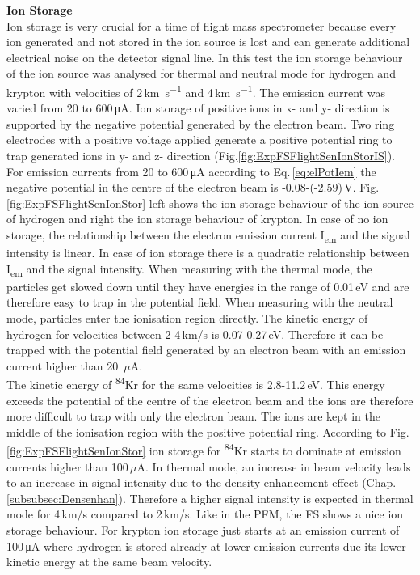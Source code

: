 		\textbf{Ion Storage}\\ %
		Ion storage is very crucial for a time of flight mass spectrometer because every ion generated and not stored in the ion source is lost and can generate additional electrical noise on the detector signal line. In this test the ion storage behaviour of the ion source was analysed for thermal and neutral mode for hydrogen and krypton with velocities of 2\,\si{\kilo\meter\per\second} and 4\,\si{\kilo\meter\per\second}. The emission current was varied from 20 to 600\,\si{\micro\ampere}. Ion storage of positive ions in x- and y- direction is supported by the negative potential generated by the electron beam. Two ring electrodes with a positive voltage applied generate a positive potential ring to trap generated ions in y- and z- direction (Fig.\ref{fig:ExpFSFlightSenIonStorIS}). For emission currents from 20 to 600\,\si{\micro\ampere} according to Eq.\,\eqref{eq:elPotIem} the negative potential in the centre of the electron beam is -0.08-(-2.59)\,\si{\volt}. Fig.\ref{fig:ExpFSFlightSenIonStor} left shows the ion storage behaviour of the ion source of hydrogen and right the ion storage behaviour of krypton. In case of no ion storage, the relationship between the electron emission current I\textsubscript{em} and the signal intensity is linear. In case of ion storage there is a quadratic relationship between I\textsubscript{em} and the signal intensity. When measuring with the thermal mode, the particles get slowed down until they have energies in the range of 0.01\,\si{\electronvolt} and are therefore easy to trap in the potential field. When measuring with the neutral mode, particles enter the ionisation region directly. The kinetic energy of hydrogen for velocities between 2-4\,km/s is 0.07-0.27\,eV. Therefore it can be trapped with the potential field generated by an electron beam with an emission current higher than 20~$\mu$A.\\
		The kinetic energy of \textsuperscript{84}Kr for the same velocities is 2.8-11.2\,eV. This energy exceeds the potential of the centre of the electron beam and the ions are therefore more difficult to trap with only the electron beam. The ions are kept in the middle of the ionisation region with the positive potential ring. According to Fig.\,\ref{fig:ExpFSFlightSenIonStor} ion storage for \textsuperscript{84}Kr starts to dominate at emission currents higher than 100\,$\mu$A. In thermal mode, an increase in beam velocity leads to an increase in signal intensity due to the density enhancement effect (Chap.\,\ref{subsubsec:Densenhan}). Therefore a higher signal intensity is expected in thermal mode for 4\,km/s compared to 2\,km/s. Like in the PFM, the FS shows a nice ion storage behaviour. For krypton ion storage just starts at an emission current of 100\,\si{\micro\ampere} where hydrogen is stored already at lower emission currents due its lower kinetic energy at the same beam velocity.\\
